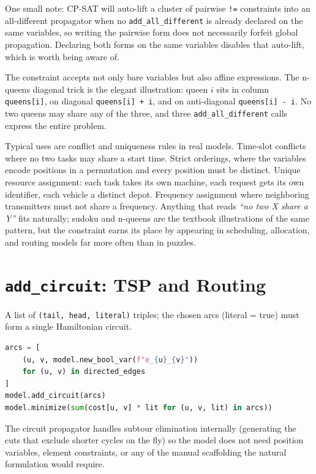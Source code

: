One small note: CP-SAT will auto-lift a cluster of pairwise
\passthrough{\lstinline"!="} constraints into an all-different
propagator when no \lstinline!add_all_different! is
already declared on the same variables, so writing the pairwise form
does not necessarily forfeit global propagation. Declaring both forms on
the same variables disables that auto-lift, which is worth being aware
of.

The constraint accepts not only bare variables but also affine
expressions. The n-queens diagonal trick is the elegant illustration:
queen \(i\) sits in column \lstinline!queens[i]!, on
diagonal \lstinline!queens[i] + i!, and on anti-diagonal
\lstinline!queens[i] - i!. No two queens may share any of
the three, and three \lstinline!add_all_different! calls
express the entire problem.

Typical uses are conflict and uniqueness rules in real models. Time-slot
conflicts where no two tasks may share a start time. Strict orderings,
where the variables encode positions in a permutation and every position
must be distinct. Unique resource assignment: each task takes its own
machine, each request gets its own identifier, each vehicle a distinct
depot. Frequency assignment where neighboring transmitters must not
share a frequency. Anything that reads \emph{``no two X share a Y''}
fits naturally; sudoku and n-queens are the textbook illustrations of
the same pattern, but the constraint earns its place by appearing in
scheduling, allocation, and routing models far more often than in
puzzles.

\section{\texorpdfstring{\texttt{add\_circuit}: TSP and Routing}{add\_circuit: TSP and Routing}}\label{sec:7.6}

A list of \lstinline!(tail, head, literal)! triples; the
chosen arcs (literal = true) must form a single Hamiltonian circuit.

\begin{lstlisting}[language=Python]
arcs = [
    (u, v, model.new_bool_var(f"e_{u}_{v}"))
    for (u, v) in directed_edges
]
model.add_circuit(arcs)
model.minimize(sum(cost[u, v] * lit for (u, v, lit) in arcs))
\end{lstlisting}

The circuit propagator handles subtour elimination internally
(generating the cuts that exclude shorter cycles on the fly) so the
model does not need position variables, element constraints, or any of
the manual scaffolding the natural formulation would require.

